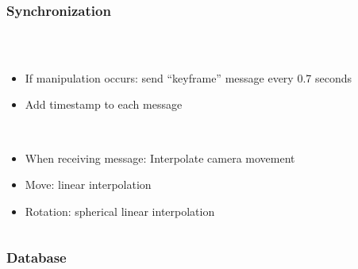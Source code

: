 \begin{frame}
  \frametitle{Synchronization}
  \begin{columns}
  	\begin{column}{0.8\textwidth}
  \begin{description}[]
    \item[Sender] \hfill \\
        \begin{itemize}
          \item If manipulation occurs: send ``keyframe'' message every 0.7 seconds
          \item Add timestamp to each message
        \end{itemize}
    \item[Receiver] \hfill \\
      \begin{itemize}
        \item When receiving message: Interpolate camera movement
        \item Move: linear interpolation
        \item Rotation: spherical linear interpolation
      \end{itemize}
  \end{description} 
    \end{column}
    \begin{column}{0.2\textwidth}
    \end{column}
  \end{columns}
\end{frame}

\begin{frame}
  \frametitle{Database}
\end{frame}

